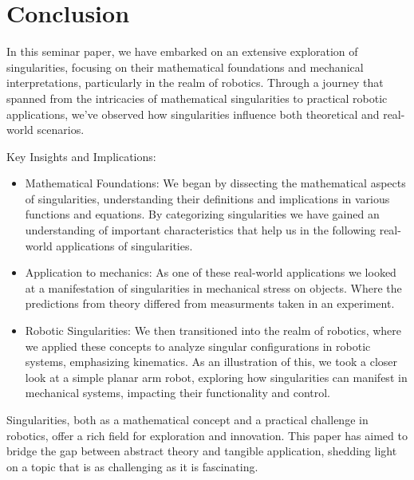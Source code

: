\documentclass[journal]{IEEEtran}
\begin{document}
\section{Conclusion}
In this seminar paper, we have embarked on an extensive exploration of singularities, focusing on their mathematical foundations and mechanical interpretations, particularly in the realm of robotics. Through a journey that spanned from the intricacies of mathematical singularities to practical robotic applications, we've observed how singularities influence both theoretical and real-world scenarios.

Key Insights and Implications:
\begin{itemize}
    \item Mathematical Foundations: We began by dissecting the mathematical aspects of singularities, understanding their definitions and implications in various functions and equations. By categorizing singularities we have gained an understanding of important characteristics that help us in the following real-world applications of singularities.
    \item Application to mechanics: As one of these real-world applications we looked at a manifestation of singularities in mechanical stress on objects. Where the predictions from theory differed from measurments taken in an experiment.
    \item Robotic Singularities: We then transitioned into the realm of robotics, where we applied these concepts to analyze singular configurations in robotic systems, emphasizing kinematics. As an illustration of this, we took a closer look at a simple planar arm robot, exploring how singularities can manifest in mechanical systems, impacting their functionality and control.
\end{itemize}
Singularities, both as a mathematical concept and a practical challenge in robotics, offer a rich field for exploration and innovation. This paper has aimed to bridge the gap between abstract theory and tangible application, shedding light on a topic that is as challenging as it is fascinating.




\end{document}
